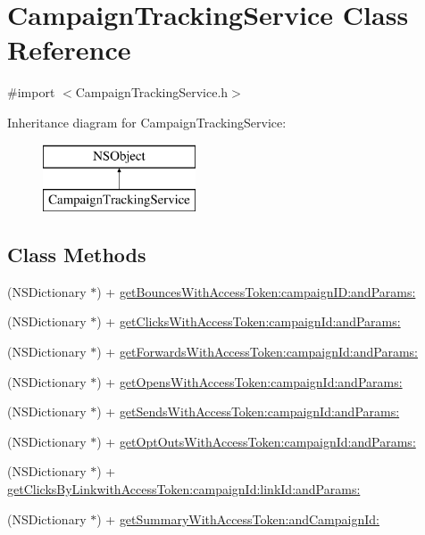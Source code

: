 \hypertarget{interface_campaign_tracking_service}{\section{Campaign\-Tracking\-Service Class Reference}
\label{interface_campaign_tracking_service}
}


{\ttfamily \#import $<$Campaign\-Tracking\-Service.\-h$>$}

Inheritance diagram for Campaign\-Tracking\-Service\-:\begin{figure}[H]
\begin{center}
\leavevmode
\includegraphics[height=2.000000cm]{interface_campaign_tracking_service}
\end{center}
\end{figure}
\subsection*{Class Methods}
\begin{DoxyCompactItemize}
\item 
(N\-S\-Dictionary $\ast$) + \hyperlink{interface_campaign_tracking_service_a5af06e3167b484b9e8b23b52b6cf85b1}{get\-Bounces\-With\-Access\-Token\-:campaign\-I\-D\-:and\-Params\-:}
\item 
(N\-S\-Dictionary $\ast$) + \hyperlink{interface_campaign_tracking_service_a932afb9c5c513a5659a33df03fd586d0}{get\-Clicks\-With\-Access\-Token\-:campaign\-Id\-:and\-Params\-:}
\item 
(N\-S\-Dictionary $\ast$) + \hyperlink{interface_campaign_tracking_service_a31e3988fa79178cd49105cc1f39ee7ea}{get\-Forwards\-With\-Access\-Token\-:campaign\-Id\-:and\-Params\-:}
\item 
(N\-S\-Dictionary $\ast$) + \hyperlink{interface_campaign_tracking_service_aa631a5089b65012afd55613611389b4b}{get\-Opens\-With\-Access\-Token\-:campaign\-Id\-:and\-Params\-:}
\item 
(N\-S\-Dictionary $\ast$) + \hyperlink{interface_campaign_tracking_service_aec1825fba92343e0b0ed256b28a1d261}{get\-Sends\-With\-Access\-Token\-:campaign\-Id\-:and\-Params\-:}
\item 
(N\-S\-Dictionary $\ast$) + \hyperlink{interface_campaign_tracking_service_a8a10f5113dcbba7d2b65d77ac2cb5b32}{get\-Opt\-Outs\-With\-Access\-Token\-:campaign\-Id\-:and\-Params\-:}
\item 
(N\-S\-Dictionary $\ast$) + \hyperlink{interface_campaign_tracking_service_a320807f0a7923d1321259480d28fbbd1}{get\-Clicks\-By\-Linkwith\-Access\-Token\-:campaign\-Id\-:link\-Id\-:and\-Params\-:}
\item 
(N\-S\-Dictionary $\ast$) + \hyperlink{interface_campaign_tracking_service_a6521f96834632a43e7f8ad4a6a17f17c}{get\-Summary\-With\-Access\-Token\-:and\-Campaign\-Id\-:}
\end{DoxyCompactItemize}


